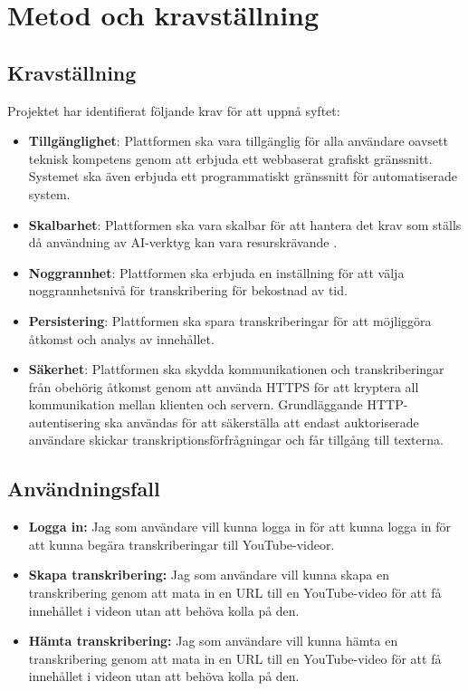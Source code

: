 \section{Metod och kravställning}
\label{sec:method-and-requirements}

\subsection{Kravställning}
\label{sec:requirements}
Projektet har identifierat följande krav för att uppnå syftet:
\begin{itemize}
    \item \textbf{Tillgänglighet}: Plattformen ska vara tillgänglig för alla
    användare oavsett teknisk kompetens genom att erbjuda ett webbaserat
    grafiskt gränssnitt. Systemet ska även erbjuda ett programmatiskt
    gränssnitt för automatiserade system.
    \item \textbf{Skalbarhet}: Plattformen ska vara skalbar för att hantera
    det krav som ställs då användning av AI-verktyg kan vara resurskrävande
    \cite{GreenSoftwareFoundation2024CanAITrulyBeGreen}.
    \item \textbf{Noggrannhet}: Plattformen ska erbjuda en inställning för att
    välja noggrannhetsnivå för transkribering för bekostnad av tid.
    \item \textbf{Persistering}: Plattformen ska spara transkriberingar för
    att möjliggöra åtkomst och analys av innehållet.
    \item \textbf{Säkerhet}: Plattformen ska skydda kommunikationen och
    transkriberingar från obehörig åtkomst genom att använda HTTPS för att
    kryptera all kommunikation mellan klienten och servern. Grundläggande
    HTTP-autentisering ska användas för att säkerställa att endast
    auktoriserade användare skickar transkriptionsförfrågningar och får
    tillgång till texterna.
\end{itemize}

\subsection{Användningsfall}
\label{sec:use-cases}

\begin{itemize}
    \item \textbf{Logga in:} Jag som användare vill kunna logga in för att
    kunna logga in för att kunna begära transkriberingar till YouTube-videor.
    \item \textbf{Skapa transkribering:} Jag som användare vill kunna skapa en
    transkribering genom att mata in en URL till en YouTube-video för att få
    innehållet i videon utan att behöva kolla på den.
    \item \textbf{Hämta transkribering:} Jag som användare vill kunna hämta en
    transkribering genom att mata in en URL till en YouTube-video för att få
    innehållet i videon utan att behöva kolla på den.
\end{itemize}

